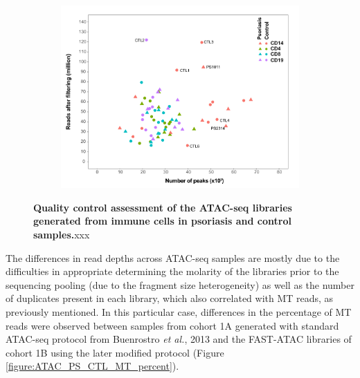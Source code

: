 \begin{figure}[htbp]
\begin{subfigure}{0.5\textwidth}
\caption{\textbf{}}
\end{subfigure}
\begin{subfigure}{0.5\textwidth}
\centering
\includegraphics[width=\textwidth]{./Results2/pdfs/ATAC_PS_CTL_reads_vs_peaks_dotplot}
\caption{\textbf{}}
\end{subfigure}
\caption[Quality control assessment of the ATAC-seq libraries generated from immune cells in psoriasis and control samples.]{\textbf{Quality control assessment of the ATAC-seq libraries generated from immune cells in psoriasis and control samples.}xxx}
\label{figure:ATAC_PS_CTL_QC}
\end{figure} 


The differences in read depths across ATAC-seq samples are mostly due to the difficulties in appropriate determining the molarity of the libraries prior to the sequencing pooling (due to the fragment size heterogeneity) as well as the number of duplicates present in each library, which also correlated with MT reads, as previously mentioned. In this particular case, differences in the percentage of MT reads were observed between samples from cohort 1A generated with standard ATAC-seq protocol from Buenrostro \textit{et al.}, 2013 and the FAST-ATAC libraries of cohort 1B using the later modified \parencite{Corces2016} protocol (Figure \ref{figure:ATAC_PS_CTL_MT_percent}). 

